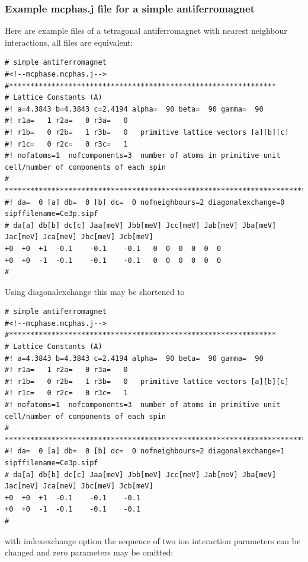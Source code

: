 \subsubsection{Example {\prg mcphas.j} file for a simple antiferromagnet}

Here are example files of a tetragonal antiferromagnet with nearest neighbour interactions, all
files are equivalent:

{\small
\begin{verbatim} 
# simple antiferromagnet 
#<!--mcphase.mcphas.j-->
#***************************************************************
# Lattice Constants (A)
#! a=4.3843 b=4.3843 c=2.4194 alpha=  90 beta=  90 gamma=  90
#! r1a=   1 r2a=   0 r3a=   0
#! r1b=   0 r2b=   1 r3b=   0   primitive lattice vectors [a][b][c]
#! r1c=   0 r2c=   0 r3c=   1
#! nofatoms=1  nofcomponents=3  number of atoms in primitive unit cell/number of components of each spin
# ****************************************************************************
#! da=  0 [a] db=  0 [b] dc=  0 nofneighbours=2 diagonalexchange=0  sipffilename=Ce3p.sipf
# da[a] db[b] dc[c] Jaa[meV] Jbb[meV] Jcc[meV] Jab[meV] Jba[meV] Jac[meV] Jca[meV] Jbc[meV] Jcb[meV]
+0	+0	+1	-0.1	-0.1	-0.1   0  0  0  0  0  0
+0	+0	-1	-0.1	-0.1	-0.1   0  0  0  0  0  0
#\end{verbatim}
}

Using diagonalexchange this may be shortened to

{\small
\begin{verbatim} 
# simple antiferromagnet 
#<!--mcphase.mcphas.j-->
#***************************************************************
# Lattice Constants (A)
#! a=4.3843 b=4.3843 c=2.4194 alpha=  90 beta=  90 gamma=  90
#! r1a=   1 r2a=   0 r3a=   0
#! r1b=   0 r2b=   1 r3b=   0   primitive lattice vectors [a][b][c]
#! r1c=   0 r2c=   0 r3c=   1
#! nofatoms=1  nofcomponents=3  number of atoms in primitive unit cell/number of components of each spin
# ****************************************************************************
#! da=  0 [a] db=  0 [b] dc=  0 nofneighbours=2 diagonalexchange=1  sipffilename=Ce3p.sipf
# da[a] db[b] dc[c] Jaa[meV] Jbb[meV] Jcc[meV] Jab[meV] Jba[meV] Jac[meV] Jca[meV] Jbc[meV] Jcb[meV]
+0	+0	+1	-0.1	-0.1	-0.1   
+0	+0	-1	-0.1	-0.1	-0.1   
#\end{verbatim}
}

with indexexchange option the sequence of two ion interaction parameters can be changed and
zero parameters may be omitted:

